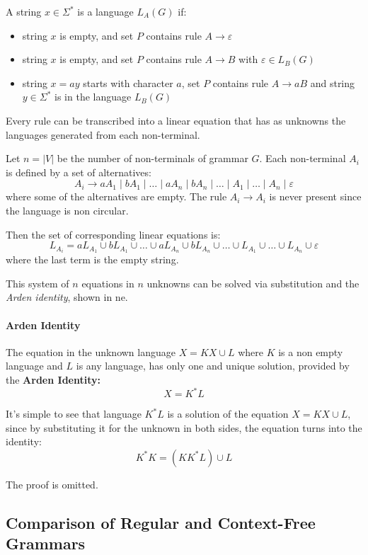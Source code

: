 \documentclass[english]{article}
\begin{document}
A string \(x \in \Sigma^\ast\) is a language \(L_A(G)\) if:

\begin{itemize}
  \item string \(x\) is empty, and set \(P\) contains rule \(A \rightarrow \varepsilon\)
  \item string \(x\) is empty, and set \(P\) contains rule \(A \rightarrow B\) with \(\varepsilon \in L_B(G)\)
  \item string \(x = ay\) starts with character \(a\), set \(P\) contains rule \(A \rightarrow aB\) and string \(y \in \Sigma^\ast\) is in the language \(L_B(G)\)
\end{itemize}

Every rule can be transcribed into a linear equation that has as unknowns the languages generated from each non-terminal.

Let \(n = |V|\) be the number of non-terminals of grammar \(G\).
Each non-terminal \(A_i\) is defined by a set of alternatives:
\[ A_i \rightarrow a A_1 \mid b A_1 \mid \ldots \mid a A_n \mid b A_n \mid \ldots \mid A_1 \mid \ldots \mid A_n \mid \varepsilon \]
where some of the alternatives are empty. The rule \(A_i \rightarrow A_i\) is never present since the language is non circular.

Then the set of corresponding linear equations is:
\[ L_{A_i} = a L_{A_1} \cup b L_{A_1} \cup \ldots \cup a L_{A_n} \cup b L_{A_n} \cup \ldots \cup L_{A_1} \cup \ldots \cup L_{A_n} \cup \varepsilon \]
where the last term is the empty string.

This system of \(n\) equations in \(n\) unknowns can be solved via substitution and the \textit{Arden identity}, shown in ne.

\paragraph{Arden Identity}

The equation in the unknown language \(X= K X \cup L\) where \(K\) is a non empty language and \(L\) is any language, has only one and unique solution, provided by the \textbf{Arden Identity:}
\[ X = K^\ast L \]

It's simple to see that language \(K^\ast L\) is a solution of the equation \(X = K X \cup L\), since by substituting it for the unknown in both sides, the equation turns into the identity:
\[ K^\ast K = (K K^\ast L) \cup L \]

\bigskip
The proof is omitted.

\subsection{Comparison of Regular and Context-Free Grammars}
\end{document}
